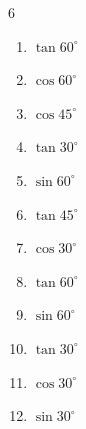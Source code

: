 \begin{multicols}{6}
\begin{enumerate}

  \item $\displaystyle \tan{60^\circ}$


  \item $\displaystyle \cos{60^\circ}$


  \item $\displaystyle \cos{45^\circ}$


  \item $\displaystyle \tan{30^\circ}$


  \item $\displaystyle \sin{60^\circ}$


  \item $\displaystyle \tan{45^\circ}$

        \phantom{$\displaystyle =1$}

\columnbreak %

  \item $\displaystyle \cos{30^\circ}$


  \item $\displaystyle \tan{60^\circ}$


  \item $\displaystyle \sin{60^\circ}$


  \item $\displaystyle \tan{30^\circ}$


  \item $\displaystyle \cos{30^\circ}$


  \item $\displaystyle \sin{30^\circ}$



\end{enumerate}
\end{multicols}
